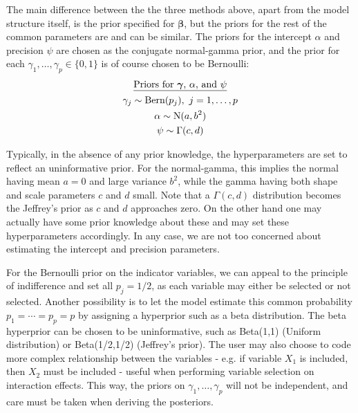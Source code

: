 The main difference between the the three methods above, apart from the model structure itself, is the prior specified for $\boldsymbol\beta$, but the priors for the rest of the common parameters are and can be similar. The priors for the intercept $\alpha$ and precision $\psi$ are chosen as the conjugate normal-gamma prior, and the prior for each $\gamma_1, \dots, \gamma_p \in \{0,1\}$ is of course chosen to be Bernoulli:
\begin{align*}
	\begin{gathered}
		\text{\underline{Priors for $\boldsymbol{\gamma}$, $\alpha$, and $\psi$}} \\
		\gamma_j \sim \text{Bern}(p_j), \ j=1,\dots,p \\
		\alpha \sim \operatorname{N}(a,b^2) \\
		\psi \sim \Gamma(c,d)
	\end{gathered}
\end{align*}

Typically, in the absence of any prior knowledge, the hyperparameters are set to reflect an uninformative prior. For the normal-gamma, this implies the normal having mean $a=0$ and large variance $b^2$, while the gamma having both shape and scale parameters $c$ and $d$ small. Note that a $\Gamma(c,d)$ distribution becomes the Jeffrey's prior as $c$ and $d$ approaches zero. On the other hand one may actually have some prior knowledge about these and may set these hyperparameters accordingly. In any case, we are not too concerned about estimating the intercept and precision parameters. 

For the Bernoulli prior on the indicator variables, we can appeal to the principle of indifference and set all $p_j = 1/2$, as each variable may either be selected or not selected. Another possibility is to let the model estimate this common probability $p_1=\cdots=p_p=p$ by assigning a hyperprior such as a beta distribution. The beta hyperprior can be chosen to be uninformative, such as Beta(1,1) (Uniform distribution) or Beta(1/2,1/2) (Jeffrey's prior). The user may also choose to code more complex relationship between the variables - e.g. if variable $X_1$ is included, then $X_2$ must be included - useful when performing variable selection on interaction effects. This way, the priors on $\gamma_1, \dots,\gamma_p$ will not be independent, and care must be taken when deriving the posteriors.

